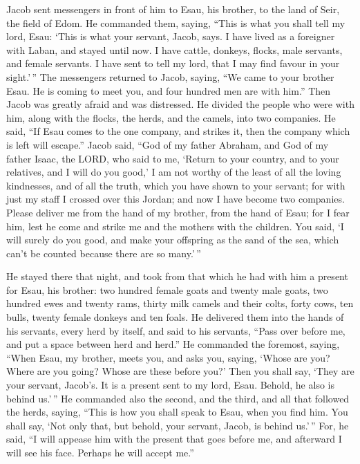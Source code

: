  Jacob sent messengers in front of him to Esau, his brother,
to the land of Seir, the field of Edom.  He commanded them,
saying, ``This is what you shall tell my lord, Esau: `This is what your
servant, Jacob, says. I have lived as a foreigner with Laban, and stayed
until now.  I have cattle, donkeys, flocks, male servants,
and female servants. I have sent to tell my lord, that I may find favour
in your sight.'\,''  The messengers returned to Jacob,
saying, ``We came to your brother Esau. He is coming to meet you, and
four hundred men are with him.''  Then Jacob was greatly
afraid and was distressed. He divided the people who were with him,
along with the flocks, the herds, and the camels, into two companies.
 He said, ``If Esau comes to the one company, and strikes
it, then the company which is left will escape.''  Jacob
said, ``God of my father Abraham, and God of my father Isaac, the LORD,
who said to me, `Return to your country, and to your relatives, and I
will do you good,'  I am not worthy of the least of all the
loving kindnesses, and of all the truth, which you have shown to your
servant; for with just my staff I crossed over this Jordan; and now I
have become two companies.  Please deliver me from the hand
of my brother, from the hand of Esau; for I fear him, lest he come and
strike me and the mothers with the children.  You said, `I
will surely do you good, and make your offspring as the sand of the sea,
which can't be counted because there are so many.'\,''

 He stayed there that night, and took from that which he
had with him a present for Esau, his brother:  two hundred
female goats and twenty male goats, two hundred ewes and twenty rams,
 thirty milk camels and their colts, forty cows, ten bulls,
twenty female donkeys and ten foals.  He delivered them
into the hands of his servants, every herd by itself, and said to his
servants, ``Pass over before me, and put a space between herd and
herd.''  He commanded the foremost, saying, ``When Esau, my
brother, meets you, and asks you, saying, `Whose are you? Where are you
going? Whose are these before you?'  Then you shall say,
`They are your servant, Jacob's. It is a present sent to my lord, Esau.
Behold, he also is behind us.'\,''  He commanded also the
second, and the third, and all that followed the herds, saying, ``This
is how you shall speak to Esau, when you find him.  You
shall say, `Not only that, but behold, your servant, Jacob, is behind
us.'\,'' For, he said, ``I will appease him with the present that goes
before me, and afterward I will see his face. Perhaps he will accept
me.''

